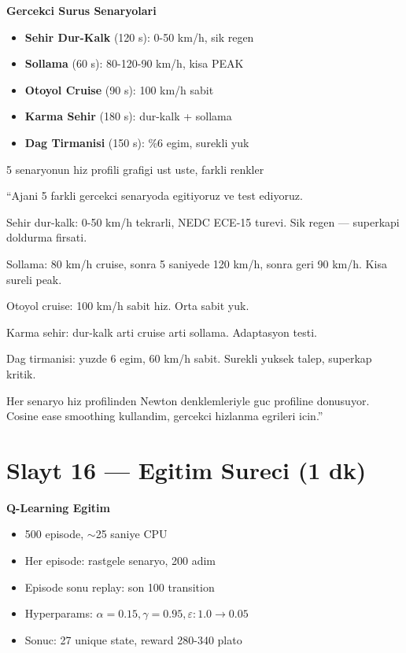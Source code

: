 \documentclass[11pt,a4paper]{article}
\begin{document}
\begin{slytboks}
\textbf{Gercekci Surus Senaryolari}
\begin{itemize}
\item \textbf{Sehir Dur-Kalk} (120 s): 0-50 km/h, sik regen
\item \textbf{Sollama} (60 s): 80-120-90 km/h, kisa PEAK
\item \textbf{Otoyol Cruise} (90 s): 100 km/h sabit
\item \textbf{Karma Sehir} (180 s): dur-kalk + sollama
\item \textbf{Dag Tirmanisi} (150 s): \%6 egim, surekli yuk
\end{itemize}
\end{slytboks}

\begin{gorselboks}
5 senaryonun hiz profili grafigi ust uste, farkli renkler
\end{gorselboks}

\begin{sayboks}
``Ajani 5 farkli gercekci senaryoda egitiyoruz ve test ediyoruz.

Sehir dur-kalk: 0-50 km/h tekrarli, NEDC ECE-15 turevi. Sik regen --- superkapi doldurma firsati.

Sollama: 80 km/h cruise, sonra 5 saniyede 120 km/h, sonra geri 90 km/h. Kisa sureli peak.

Otoyol cruise: 100 km/h sabit hiz. Orta sabit yuk.

Karma sehir: dur-kalk arti cruise arti sollama. Adaptasyon testi.

Dag tirmanisi: yuzde 6 egim, 60 km/h sabit. Surekli yuksek talep, superkap kritik.

Her senaryo hiz profilinden Newton denklemleriyle guc profiline donusuyor. Cosine ease smoothing kullandim, gercekci hizlanma egrileri icin.''
\end{sayboks}

\section{Slayt 16 --- Egitim Sureci (1 dk)}

\begin{slytboks}
\textbf{Q-Learning Egitim}
\begin{itemize}
\item 500 episode, $\sim$25 saniye CPU
\item Her episode: rastgele senaryo, 200 adim
\item Episode sonu replay: son 100 transition
\item Hyperparams: $\alpha=0.15, \gamma=0.95, \varepsilon: 1.0 \to 0.05$
\item Sonuc: 27 unique state, reward 280-340 plato
\end{itemize}
\end{slytboks}
\end{document}
